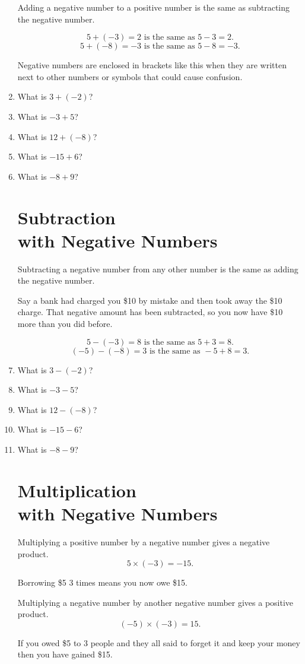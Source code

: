 \documentclass{article}
\begin{document}
\begin{enumerate}
Adding a negative number to a positive number is the same as subtracting the negative number.

$$5+(-3)=2 \textrm{ is the same as } 5-3=2.$$
$$5+(-8)=-3 \textrm{ is the same as } 5-8=-3.$$

Negative numbers are enclosed in brackets like this when they are written next to other numbers or symbols that could cause confusion.

\item What is $3+(-2)$?
\item What is $-3+5$?
\item What is $12+(-8)$?
\item What is $-15+6$?
\item What is $-8+9$?

\section*{Subtraction\\ with Negative Numbers}

Subtracting a negative number from any other number is the same as adding the negative number.

Say a bank had charged you \$10 by mistake and then took away the \$10 charge. That negative amount has been subtracted, so you now have \$10 more than you did before.

$$5-(-3)=8 \textrm{ is the same as } 5+3=8.$$
$$(-5)-(-8)=3 \textrm{ is the same as } -5+8=3.$$

\item What is $3-(-2)$?
\item What is $-3-5$?
\item What is $12-(-8)$?
\item What is $-15-6$?
\item What is $-8-9$?

\section*{Multiplication\\ with Negative Numbers}

Multiplying a positive number by a negative number gives a negative product.
$$5\times(-3)=-15.$$

Borrowing \$5 3 times means you now owe \$15.

Multiplying a negative number by another negative number gives a positive product.
$$(-5)\times(-3)=15.$$

If you owed \$5 to 3 people and they all said to forget it and keep your money then you have gained \$15.


\end{enumerate}
\end{document}
